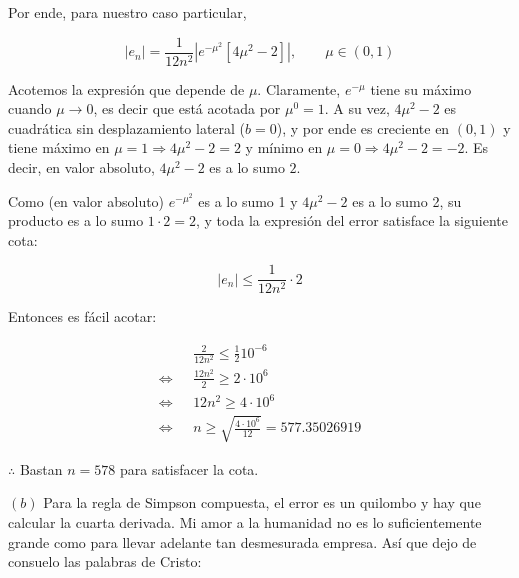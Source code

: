 \documentclass[12pt]{article}
\begin{document}
Por ende, para nuestro caso particular,

\begin{equation*}
    |e_n| = \frac{1}{12n^2}   \left| e^{-\mu^2} \left[ 4\mu^2 - 2 \right] \right| , \qquad
    \mu \in (0, 1)
\end{equation*}

Acotemos la expresión que depende de $\mu$. Claramente, $e^{-\mu}$ tiene su
máximo cuando $\mu \to 0$, es decir que está acotada por $\mu^0 = 1$. A su vez,
$4 \mu^2 - 2$ es cuadrática sin desplazamiento lateral ($b = 0$), y por ende es
creciente en $(0, 1)$  y tiene máximo en $\mu = 1 \Rightarrow 4\mu^2 - 2 =
2$ y mínimo en $\mu = 0 \Rightarrow 4\mu^2 - 2 = -2$. Es decir, en valor
absoluto, $4\mu^2 - 2$ es  a lo sumo $2$.

Como (en valor absoluto) $e^{-\mu^2}$ es a lo sumo 1 y $4\mu^2 - 2$ es a lo sumo
2, su producto es a lo sumo $1 \cdot 2 = 2$, y toda la expresión del error
satisface la siguiente cota:

\begin{equation*}
    \left| e_n \right| \leq \frac{1}{12n^2} \cdot 2
\end{equation*}

Entonces es fácil acotar: 

\begin{align*}
&\frac{2}{12n^2} \leq \frac{1}{2} 10^{-6} \\
\iff ~ ~ ~ 
&\frac{ 12n^2 }{2} \geq 2 \cdot 10^{6}\\ 
\iff ~ ~ ~ 
&12n^2 \geq 4 \cdot 10^6 \\ 
\iff ~ ~ ~ 
&n \geq \sqrt{\frac{ 4 \cdot 10^6 }{12}} = 577.35026919
\end{align*}

$\therefore $ Bastan $n = 578$ para satisfacer la cota.

\pagebreak 

$(b)$ Para la regla de Simpson compuesta, el error es un quilombo y hay que
calcular la cuarta derivada. Mi amor a la humanidad no es lo suficientemente
grande como para llevar adelante tan desmesurada empresa. Así que dejo de
consuelo las palabras de Cristo:
 
\end{document}
